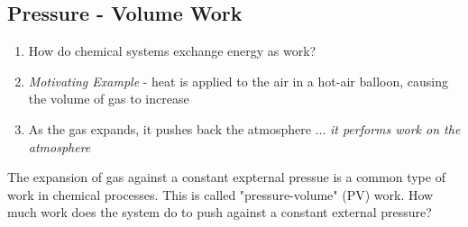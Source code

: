 \documentclass{article}  %
\begin{document}
\subsection*{Pressure - Volume Work}
\begin{enumerate}
    \item How do chemical systems exchange energy as work?
    \item \emph{Motivating Example} - heat is applied to the air in a hot-air balloon, causing the volume of gas to increase
    \item As the gas expands, it pushes back the atmosphere ... \emph{it performs work on the atmosphere}
\end{enumerate}
The expansion of gas against a constant expternal pressue is a common type of work in chemical processes. This is called "pressure-volume" (PV) work. 
\newline
How much work does the system do to push against a constant external pressure? 
\newline
\end{document}
